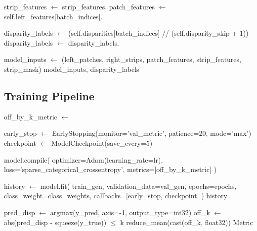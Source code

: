 \documentclass[12pt]{article}
\begin{document}
\begin{algorithm}[H]
\begin{algorithmic}[1]
    \State strip\_features $\gets$ strip\_features.
    \State patch\_features $\gets$ self.left\_features[batch\_indices].
    
    \State {}
    \State disparity\_labels $\gets$ (self.disparities[batch\_indices] // (self.disparity\_skip + 1))
    \State disparity\_labels $\gets$ disparity\_labels.
    
    \State {}
    \State model\_inputs $\gets$ (left\_patches, right\_strips, patch\_features, strip\_features, strip\_mask)
    \State \Return model\_inputs, disparity\_labels
\EndProcedure

        \State {} 
    \EndIf
\EndProcedure
\end{algorithmic}
\end{algorithm}

\subsection{Training Pipeline}

\begin{algorithm}[H]
\caption{Complete Training Workflow}
\begin{algorithmic}[1]
\State {}
\State off\_by\_k\_metric $\gets$ 

\State {}
\State early\_stop $\gets$ EarlyStopping(monitor='val\_metric', patience=20, mode='max')
\State checkpoint $\gets$ ModelCheckpoint(save\_every=5)

\State {}
\State model.compile(
    \State \quad optimizer=Adam(learning\_rate=lr),
    \State \quad loss='sparse\_categorical\_crossentropy',
    \State \quad metrics=[off\_by\_k\_metric]
\State )

\State {}
\State history $\gets$ model.fit(
    \State \quad train\_gen,
    \State \quad validation\_data=val\_gen, 
    \State \quad epochs=epochs,
    \State \quad class\_weight=class\_weights,
    \State \quad callbacks=[early\_stop, checkpoint]
\State )
\State \Return history
\EndProcedure

\State {}
    \State pred\_disp $\gets$ argmax(y\_pred, axis=-1, output\_type=int32)
    \State off\_k $\gets$ abs(pred\_disp - squeeze(y\_true)) $\leq$ k
    \State \Return reduce\_mean(cast(off\_k, float32))
\EndFunction
\State \Return Metric
\EndFunction
\end{algorithmic}
\end{algorithm}
\end{document}
